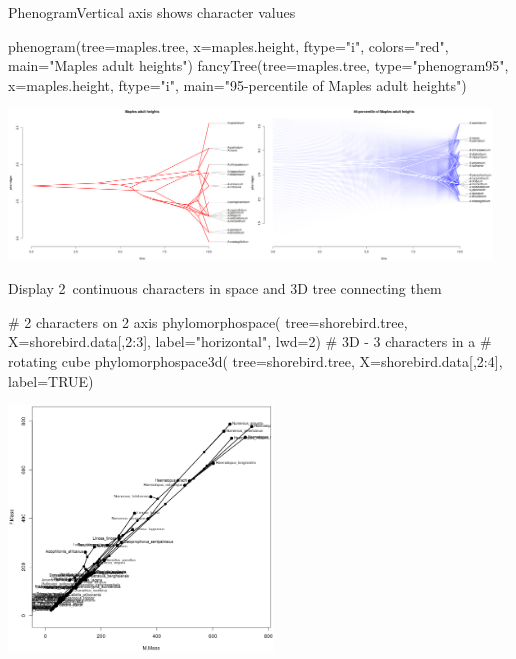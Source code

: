 \documentclass[compress, xelatex, 11pt, xcolor=svgnames, aspectratio=169,
	hyperref={
		bookmarks=true,
		unicode=true,
		colorlinks=true,
		pdftitle={Molecular data in R},
		plainpages=false,
		pdfauthor={Vojtech Zeisek},
		pdfsubject={Course about phylogeny and evolution in R},
		pdfcreator={XeLaTeX},
		pdfkeywords={R, evolution, phylogeny, molecular data},
		linkcolor=Crimson, %
		anchorcolor=Magenta, %
		citecolor=Magenta, %
		filecolor=Magenta, %
		menucolor=Magenta, %
		urlcolor=DodgerBlue, %
		},
	url={hyphens, lowtilde} %
	]{beamer}
\begin{document}
\begin{frame}[fragile]{Phenogram}{Vertical axis shows character values}
	\begin{spluscode}
    phenogram(tree=maples.tree, x=maples.height, ftype="i", colors="red",
      main="Maples adult heights")
    fancyTree(tree=maples.tree, type="phenogram95", x=maples.height,
      ftype="i", main="95-percentile of Maples adult heights")
	\end{spluscode}
	\begin{center}
		\includegraphics[height=4cm]{phenogram.png}
	\end{center}
\end{frame}

\begin{frame}[fragile]{Display 2~continuous characters in space and 3D tree connecting them}
	\begin{multicols}{2}
		\begin{spluscode}
    # 2 characters on 2 axis
    phylomorphospace(
      tree=shorebird.tree,
      X=shorebird.data[,2:3],
      label="horizontal", lwd=2)
    # 3D - 3 characters in a
    # rotating cube
    phylomorphospace3d(
      tree=shorebird.tree,
      X=shorebird.data[,2:4],
      label=TRUE)
		\end{spluscode}
		\begin{center}
			\includegraphics[height=6.5cm]{phylomorphospace.png}
		\end{center}
	\end{multicols}
\end{frame}
\end{document}

